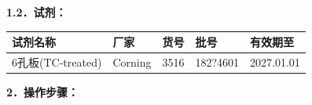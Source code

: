 \documentclass[UTF8,10pt,a4paper,fontset=fandol]{ctexart}
\newcommand{\fieldvalue}[1]{#1}
\newcommand{\handwritten}[1]{#1}
\begin{document}
\textbf{1.2．试剂：}

\begin{tabularx}{\textwidth}{|X|X|X|X|X|}
\hline
试剂名称 & 厂家 & 货号 & 批号 & 有效期至 \\ \hline
\fieldvalue{6孔板(TC-treated)} &
\fieldvalue{Corning} &
\fieldvalue{3516} &
\fieldvalue{\handwritten{182?4601}} &
\fieldvalue{\handwritten{2027.01.01}}
\\ \hline
\end{tabularx}

\textbf{2．操作步骤：}
\end{document}
